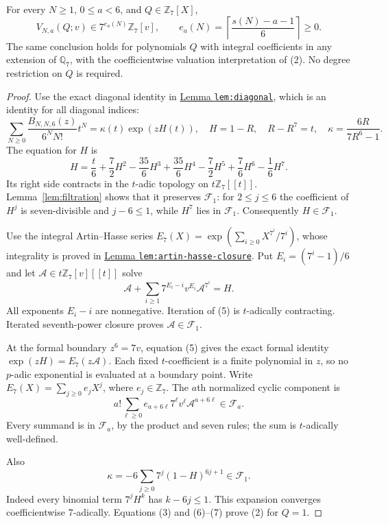 \documentclass[11pt]{article}
\begin{document}
\begin{theorem}\label{thm:content}
For every $N\ge1$, $0\le a<6$, and $Q\in\mathbb Z_7[X]$,
\[
 V_{N,a}(Q;v)\in7^{e_a(N)}\mathbb Z_7[v],
 \qquad e_a(N)=
       \left\lceil\frac{s(N)-a-1}{6}\right\rceil\ge0.
 \tag{2}
\]
The same conclusion holds for polynomials $Q$ with integral
coefficients in any extension of $\mathbb Q_7$, with the
coefficientwise valuation interpretation of (2).
No degree restriction on $Q$ is required.
\end{theorem}
\begin{proof}
Use the exact diagonal identity in
\href{GAP_SIX_TWO_POWER_PLUS_ONE_SFC.tex}
{Lemma \texttt{lem:diagonal}},
which is an identity for all diagonal indices:
\[
 \sum_{N\ge0}\frac{B_{N,N,6}(z)}{6^NN!}t^N
       =\kappa(t)\exp(zH(t)),\quad
 H=1-R,\quad R-R^7=t,\quad
 \kappa=\frac{6R}{7R^6-1}.
 \tag{3}
\]
The equation for $H$ is
\[
 H=\frac t6+\frac72H^2-\frac{35}6H^3
          +\frac{35}6H^4-\frac72H^5+\frac76H^6-\frac16H^7 .
 \tag{4}
\]
Its right side contracts in the $t$-adic topology on
$t\mathbb Z_7[[t]]$. Lemma~\ref{lem:filtration} shows that it
preserves $\mathcal F_1$: for $2\le j\le6$ the coefficient of
$H^j$ is seven-divisible and $j-6\le1$, while $H^7$ lies in
$\mathcal F_1$. Consequently $H\in\mathcal F_1$.

Use the integral Artin--Hasse series
$E_7(X)=\exp(\sum_{i\ge0}X^{7^i}/7^i)$, whose integrality is
proved in
\href{ARITHMETIC_FRONTIER_TERMINAL_ORDERS.tex}
{Lemma \texttt{lem:artin-hasse-closure}}.
Put $E_i=(7^i-1)/6$ and let $\mathscr A\in
t\mathbb Z_7[v][[t]]$ solve
\[
 \mathscr A+\sum_{i\ge1}7^{E_i-i}v^{E_i}
                   \mathscr A^{7^i}=H.                 \tag{5}
\]
All exponents $E_i-i$ are nonnegative. Iteration of (5) is
$t$-adically contracting. Iterated seventh-power closure proves
$\mathscr A\in\mathcal F_1$.

At the formal boundary $z^6=7v$, equation (5) gives the exact
formal identity $\exp(zH)=E_7(z\mathscr A)$.
Each fixed $t$-coefficient is a finite polynomial in $z$, so no
$p$-adic exponential is evaluated at a boundary point.
Write $E_7(X)=\sum_{j\ge0}e_jX^j$, where $e_j\in\mathbb Z_7$.
The $a$th normalized cyclic component is
\[
 a!\sum_{\ell\ge0}e_{a+6\ell}7^\ell v^\ell
                          \mathscr A^{a+6\ell}
                  \in\mathcal F_a.                    \tag{6}
\]
Every summand is in $\mathcal F_a$, by the product and seven
rules; the sum is $t$-adically well-defined.

Also
\[
 \kappa=-6\sum_{j\ge0}7^j(1-H)^{6j+1}\in\mathcal F_1.
 \tag{7}
\]
Indeed every binomial term $7^jH^k$ has
$k-6j\le1$. This expansion converges coefficientwise
$7$-adically. Equations (3) and (6)--(7) prove (2) for $Q=1$.


\end{proof}
\end{document}
